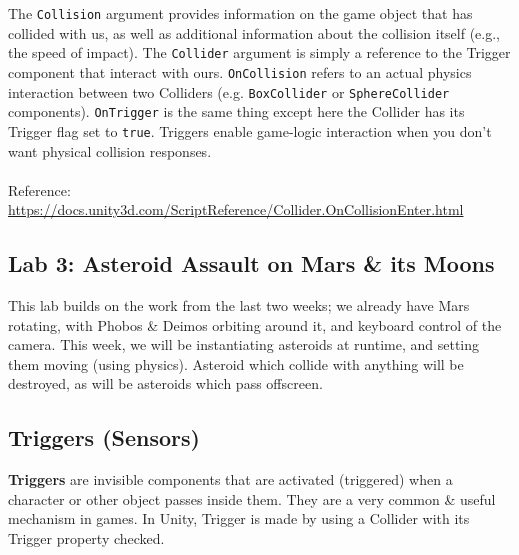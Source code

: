 \documentclass[a4paper,11pt]{article}
\begin{document}
The \verb|Collision| argument provides information on the game object that has collided with us, as well as additional 
information about the collision itself (e.g., the speed of impact). 
The \verb|Collider| argument is simply a reference to the Trigger component that interact with ours. 
\verb|OnCollision| refers to an actual physics interaction between two Colliders (e.g. \verb|BoxCollider| or
\verb|SphereCollider| components). 
\verb|OnTrigger| is the same thing except here the Collider has its Trigger flag set to \verb|true|. 
Triggers enable game-logic interaction when you don't want physical collision responses.
\\\\
Reference: \url{https://docs.unity3d.com/ScriptReference/Collider.OnCollisionEnter.html}

\subsection{Lab 3: Asteroid Assault on Mars \& its Moons}
This lab builds on the work from the last two weeks; we already have Mars rotating, with Phobos \& Deimos orbiting around 
it, and keyboard control of the camera. 
This week, we will be instantiating asteroids at runtime, and setting them moving (using physics). 
Asteroid which collide with anything will be destroyed, as will be asteroids which pass offscreen.

\subsection{Triggers (Sensors)}
\textbf{Triggers} are invisible components that are activated (triggered) when a character or other object passes inside 
them. 
They are a very common \& useful mechanism in games. 
In Unity, Trigger is made by using a Collider with its Trigger property checked. 
\end{document}
